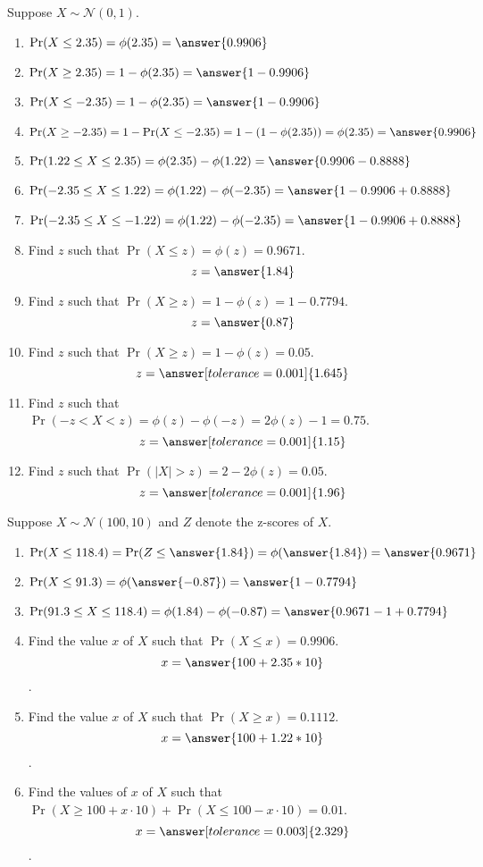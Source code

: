 \documentclass{ximera}
\begin{document}
\begin{problem}
Suppose $X\sim \mathcal N(0,1).$ 
\begin{enumerate}
\item $\Pr(X\leq 2.35)=\phi(2.35)=\answer{0.9906}$
\item $\Pr(X\geq 2.35)=1-\phi(2.35)=\answer{1-0.9906}$
\item $\Pr(X\leq -2.35)=1-\phi(2.35)=\answer{1-0.9906}$
\item $\Pr(X\geq -2.35)=1-\Pr(X\leq -2.35)=1-(1-\phi(2.35))=\phi(2.35)=\answer{0.9906}$
\item $\Pr(1.22\leq X\leq 2.35)=\phi(2.35)-\phi(1.22)=\answer{0.9906-0.8888}$
\item $\Pr(-2.35\leq X\leq 1.22)=\phi(1.22)-\phi(-2.35)=\answer{1-0.9906+0.8888}$
\item $\Pr(-2.35\leq X\leq -1.22)=\phi(1.22)-\phi(-2.35)=\answer{1-0.9906+0.8888}$
\item Find $z$ such that $\Pr(X\leq z)=\phi(z)={0.9671}$.
$$z=\answer{1.84}$$
\item Find $z$ such that $\Pr(X\geq z)=1-\phi(z)={1-0.7794}$.
$$z=\answer{0.87}$$
\item Find $z$ such that $\Pr(X\geq z)=1-\phi(z)={0.05}$.
$$z=\answer[tolerance=0.001]{1.645}$$
\item Find $z$ such that $\Pr(-z<X< z)=\phi(z)-\phi(-z)=2\phi(z)-1={0.75}$.
$$z=\answer[tolerance=0.001]{1.15}$$
\item Find $z$ such that $\Pr(|X|> z)=2-2\phi(z)={0.05}$.
$$z=\answer[tolerance=0.001]{1.96}$$

\end{enumerate}
\end{problem}

\begin{problem}
Suppose $X\sim \mathcal N(100,10)$ and $Z$ denote the z-scores of $X$. 
\begin{enumerate}
\item $\Pr(X\leq 118.4)=\Pr(Z\leq \answer{1.84})=\phi(\answer{1.84})=\answer{0.9671}$
\item $\Pr(X\leq 91.3)=\phi(\answer{-0.87})=\answer{1-0.7794}$
\item $\Pr(91.3\leq X\leq 118.4)=\phi(1.84)-\phi(-0.87)=\answer{0.9671-1+0.7794}$
\item Find the value $x$ of $X$ such that $\Pr(X\leq x)=0.9906$.
$$x=\answer{100+2.35*10}$$.
\item Find the value $x$ of $X$ such that $\Pr(X\geq x)=0.1112$.
$$x=\answer{100+1.22*10}$$.
\item Find the values of $x$ of $X$ such that $\Pr(X\geq 100+x\cdot 10)+\Pr(X\leq 100-x\cdot 10)=0.01$.
$$x=\answer[tolerance=0.003]{2.329}$$.
\end{enumerate}
\end{problem}
\end{document}
